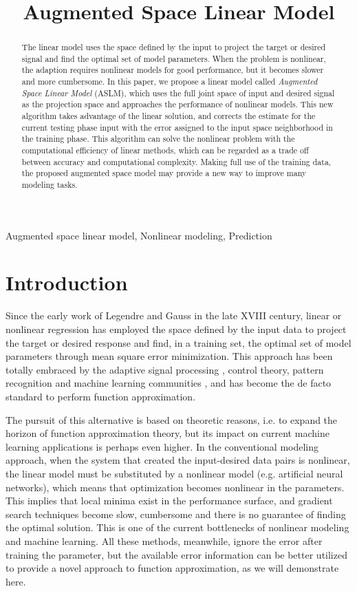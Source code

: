 \documentclass{article}
\title{Augmented Space Linear Model}
\begin{document}
%        
\maketitle
%
\begin{abstract}
The linear model uses the space defined by the input to project the target or desired signal and find the optimal set of model parameters. When the problem is nonlinear, the adaption requires nonlinear models for good performance, but it becomes slower and more cumbersome. In this paper, we propose a linear model called \textit{Augmented Space Linear Model} (ASLM), which uses the full joint space of input and desired signal as the projection space and approaches the performance of nonlinear models. This new algorithm takes advantage of the linear solution, and corrects the estimate for the current testing phase input with the error assigned to the input space neighborhood in the training phase. This algorithm can solve the nonlinear problem with the computational efficiency of linear methods, which can be regarded as a trade off between accuracy and computational complexity. Making full use of the training data, the proposed augmented space model may provide a new way to improve many modeling tasks.
\end{abstract}
%
\begin{keywords}
Augmented space linear model, Nonlinear modeling, Prediction
\end{keywords}
%
\section{Introduction}
\label{sec:intro}

Since the early work of Legendre and Gauss in the late XVIII century, linear or nonlinear regression has employed the space defined by the input data to project the target or desired response and find, in a training set, the optimal set of model parameters through mean square error minimization. This approach has been totally embraced by the adaptive signal processing \cite{haykin2008adaptive}, control theory, pattern recognition and machine learning communities \cite{duda2012pattern}, and has become the de facto standard to perform function approximation. 

The pursuit of this alternative is based on theoretic reasons, i.e. to expand the horizon of function approximation theory, but its impact on current machine learning applications is perhaps even higher. In the conventional modeling approach, when the system that created the input-desired data pairs is nonlinear, the linear model must be substituted by a nonlinear model (e.g. artificial neural networks), which means that optimization becomes nonlinear in the parameters. This implies that local minima exist in the performance surface, and gradient search techniques become slow, cumbersome and there is no guarantee of finding the optimal solution. This is one of the current bottlenecks of nonlinear modeling and machine learning. All these methods, meanwhile, ignore the error after training the parameter, but the available error information can be better utilized to provide a novel approach to function approximation, as we will demonstrate here.
\end{document}
